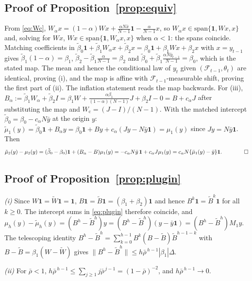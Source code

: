 \documentclass[12pt]{article}
\theoremstyle{plain}
\theoremstyle{definition}
\theoremstyle{remark}
\newcommand{\one}{\mathbf{1}}
\newcommand{\calF}{\mathcal{F}}
\newcommand{\Wc}{W_{\mathrm{c}}}
\begin{document}
\subsection{Proof of Proposition~\ref{prop:equiv}}
From \eqref{eq:Wc}, $W_\alpha x=(1-\alpha)Wx+\tfrac{\alpha N\bar x}{N-1}\one-\tfrac{\alpha}{N-1}x$, so $W_\alpha x\in\mathrm{span}\{\one,Wx,x\}$ and, solving for $Wx$, $Wx\in\mathrm{span}\{\one,W_\alpha x,x\}$ when $\alpha<1$: the spans coincide. Matching coefficients in $\tilde\beta_0\one+\tilde\beta_1W_\alpha x+\tilde\beta_2x=\beta_0\one+\beta_1Wx+\beta_2x$ with $x=y_{t-1}$ gives $\tilde\beta_1(1-\alpha)=\beta_1$, $\tilde\beta_2-\tilde\beta_1\tfrac{\alpha}{N-1}=\beta_2$ and $\tilde\beta_0+\tilde\beta_1\tfrac{\alpha N\bar y_{t-1}}{N-1}=\beta_0$, which is the stated map. The mean and hence the conditional law of $y_t$ given $(\calF_{t-1},\theta_t)$ are identical, proving (i), and the map is affine with $\calF_{t-1}$-measurable shift, proving the first part of (ii). The inflation statement reads the map backwards. For (iii), $B_\alpha:=\tilde\beta_1W_\alpha+\tilde\beta_2I=\beta_1W+\tfrac{\alpha\beta_1}{(1-\alpha)(N-1)}J+\beta_2I-0=B+c_\alpha J$ after substituting the map and $\Wc=(J-I)/(N-1)$. With the matched intercept $\tilde\beta_0=\beta_0-c_\alpha N\bar y$ at the origin $y$: $\tilde\mu_1(y)=\tilde\beta_0\one+B_\alpha y=\beta_0\one+By+c_\alpha(Jy-N\bar y\one)=\mu_1(y)$ since $Jy=N\bar y\one$. Then
\[
\tilde\mu_2(y)-\mu_2(y)=(\tilde\beta_0-\beta_0)\one+(B_\alpha-B)\mu_1(y)=-c_\alpha N\bar y\,\one+c_\alpha J\mu_1(y)=c_\alpha N\{\bar\mu_1(y)-\bar y\}\one .\qquad\qed
\]

\subsection{Proof of Proposition~\ref{prop:plugin}}

\emph{(i)} Since $W\one=\widetilde W\one=\one$, $B\one=\widetilde B\one=(\beta_1+\beta_2)\one$ and hence $B^k\one=\widetilde B^k\one$ for all $k\ge0$. The intercept sums in \eqref{eq:plugin} therefore coincide, and $\mu_h(y)-\tilde\mu_h(y)=(B^h-\widetilde B^h)y=(B^h-\widetilde B^h)(y-\bar y\one)=(B^h-\widetilde B^h)M_1y$. The telescoping identity $B^h-\widetilde B^h=\sum_{k=0}^{h-1}B^k(B-\widetilde B)\widetilde B^{h-1-k}$ with $B-\widetilde B=\beta_1(W-\widetilde W)$ gives $\|B^h-\widetilde B^h\|\le h\bar\rho^{\,h-1}|\beta_1|\Delta$.

\emph{(ii)} For $\bar\rho<1$, $h\bar\rho^{\,h-1}\le\sum_{j\ge1}j\bar\rho^{\,j-1}=(1-\bar\rho)^{-2}$, and $h\bar\rho^{\,h-1}\to0$.
\end{document}
